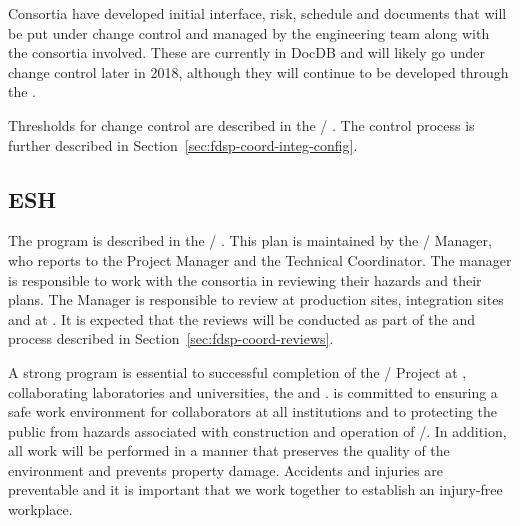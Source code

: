 Consortia have developed initial interface, risk, schedule and 
documents that will be put under change control and managed by the 
engineering team along with the consortia involved. These
are currently in DocDB and will likely go under change control later
in 2018, although they will continue to be developed through the .

Thresholds for change control are described in the
/ . The control process is further
described in Section~\ref{sec:fdsp-coord-integ-config}.

\subsection{ESH}
\label{sec:fdsp-coord-esh}

The   program is described in the
/ . This plan is maintained by
the /  Manager, who reports to the
 Project Manager and the Technical Coordinator. The
 manager is responsible to work with the consortia in
reviewing their hazards and their  plans.  The 
Manager is responsible to review  at production sites,
integration sites and at \surf. It is expected that the 
reviews will be conducted as part of the  and 
process described in Section~\ref{sec:fdsp-coord-reviews}.

A strong  program is essential to successful completion of
the / Project at \fnal, collaborating laboratories and
universities, the  and \surf.  is committed to ensuring
a safe work environment for %
collaborators at
all institutions and to protecting the public from hazards associated
with construction and operation of /. In
addition, all work will be performed in a manner that preserves the
quality of the environment and prevents property damage. Accidents and
injuries are preventable and it is important that we work together to
establish an injury-free workplace.

